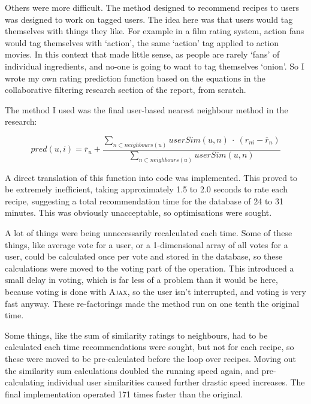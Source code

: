 Others were more difficult. The method designed to recommend recipes to users was designed to work on tagged users. The idea here was that users would tag themselves with things they like. For example in a film rating system, action fans would tag themselves with `action', the same `action' tag applied to action movies. In this context that made little sense, as people are rarely `fans' of individual ingredients, and no-one is going to want to tag themselves `onion'. So I wrote my own rating prediction function based on the equations in the collaborative filtering research section of the report, from scratch.

The method I used was the final user-based nearest neighbour method in the research:

\begin{equation}\label{eq:avgadjust}
pred(u,i) = \overline {r}_u + \frac{\sum_{n\subset neighbours(u)} userSim(u,n)~\cdot~(r_{ni}-\overline {r}_n)}{\sum_{n\subset 
neighbours(u)}userSim(u,n)}
\end{equation}

A direct translation of this function into code was implemented. This proved to be extremely inefficient, taking approximately 1.5 to 2.0 seconds to rate each recipe, suggesting a total recommendation time for the database of 24 to 31 minutes. This was obviously unacceptable, so optimisations were sought.

A lot of things were being unnecessarily recalculated each time. Some of these things, like average vote for a user, or a 1-dimensional array of all votes for a user, could be calculated once per vote and stored in the database, so these calculations were moved to the voting part of the operation. This introduced a small delay in voting, which is far less of a problem than it would be here, because voting is done with \textsc{Ajax}, so the user isn't interrupted, and voting is very fast anyway. These re-factorings made the method run on one tenth the original time.

Some things, like the sum of similarity ratings to neighbours, had to be calculated each time recommendations were sought, but not for each recipe, so these were moved to be pre-calculated before the loop over recipes. Moving out the similarity sum calculations doubled the running speed again, and pre-calculating individual user similarities caused further drastic speed increases. The final implementation operated 171 times faster than the original.


